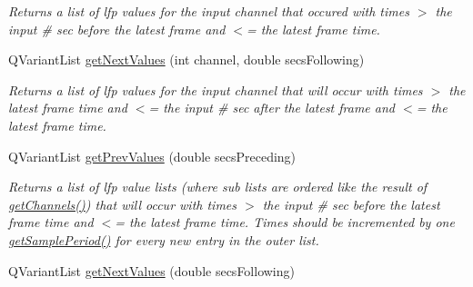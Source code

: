 \begin{DoxyCompactItemize}
\begin{DoxyCompactList}\small\item\em Returns a list of lfp values for the input channel that occured with times $>$ the input \# sec before the latest frame and $<$= the latest frame time. \end{DoxyCompactList}\item 
\hypertarget{class_picto_1_1_analysis_lfp_data_a399178b9bad5e6e9635c67e708ed6ed7}{Q\-Variant\-List \hyperlink{class_picto_1_1_analysis_lfp_data_a399178b9bad5e6e9635c67e708ed6ed7}{get\-Next\-Values} (int channel, double secs\-Following)}\label{class_picto_1_1_analysis_lfp_data_a399178b9bad5e6e9635c67e708ed6ed7}

\begin{DoxyCompactList}\small\item\em Returns a list of lfp values for the input channel that will occur with times $>$ the latest frame time and $<$= the input \# sec after the latest frame and $<$= the latest frame time. \end{DoxyCompactList}\item 
\hypertarget{class_picto_1_1_analysis_lfp_data_ad38245f741f4edeaccef993008f6778b}{Q\-Variant\-List \hyperlink{class_picto_1_1_analysis_lfp_data_ad38245f741f4edeaccef993008f6778b}{get\-Prev\-Values} (double secs\-Preceding)}\label{class_picto_1_1_analysis_lfp_data_ad38245f741f4edeaccef993008f6778b}

\begin{DoxyCompactList}\small\item\em Returns a list of lfp value lists (where sub lists are ordered like the result of \hyperlink{class_picto_1_1_analysis_lfp_data_ad3060e0658f2d7ca36e55fba037cd0ed}{get\-Channels()}) that will occur with times $>$ the input \# sec before the latest frame time and $<$= the latest frame time. Times should be incremented by one \hyperlink{class_picto_1_1_analysis_lfp_data_a4c96e05c4e349b6a0d3be781bdeee401}{get\-Sample\-Period()} for every new entry in the outer list. \end{DoxyCompactList}\item 
\hypertarget{class_picto_1_1_analysis_lfp_data_a2a3276679bc1ea73f93e1c6e8ddf3229}{Q\-Variant\-List \hyperlink{class_picto_1_1_analysis_lfp_data_a2a3276679bc1ea73f93e1c6e8ddf3229}{get\-Next\-Values} (double secs\-Following)}\label{class_picto_1_1_analysis_lfp_data_a2a3276679bc1ea73f93e1c6e8ddf3229}


\end{DoxyCompactItemize}
